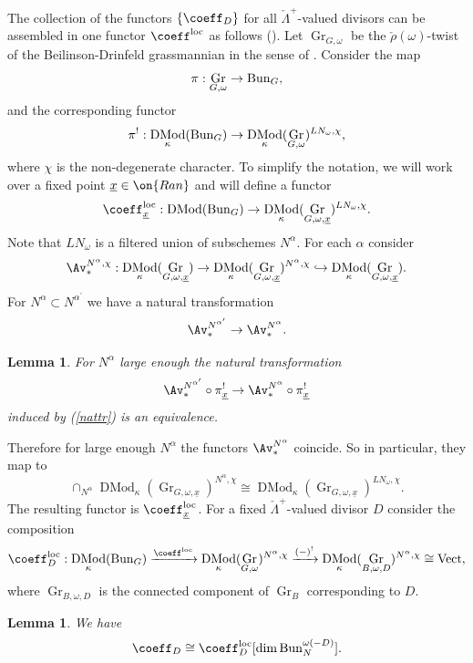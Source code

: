 \documentclass[9pt]{amsart}
\DeclareMathOperator{\Gra}{{Gr}}
\newcommand{\Ranp}{{\on{Ran}}}
\DeclareMathOperator{\Vect}{{Vect}}
\newtheorem{lm}[subsubsection]{Lemma}
\numberwithin{equation}{section}
\DeclareMathOperator{\D}{{DMod}}
\begin{document}
	\subsubsection{} The collection of the functors $\{\coeff_D \}$ for all $\check{\Lambda}^+$-valued divisors can be assembled in one functor $\coeff^{\operatorname{loc}}$ as follows (\cite[9.3]{GLCII}). Let $\Gra_{G, \omega}$ be the $\check{\rho}(\omega)$-twist of the Beilinson-Drinfeld grassmannian in the sense of \cite[1.2]{GLCII}. Consider the map 
	$$
	\pi: \Gra_{G, \omega} \rightarrow \Bun_G,
	$$
	and the corresponding functor
	$$\pi^!: \D_{\kappa}(\Bun_G) \rightarrow \D_{\kappa}(\Gra_{G, \omega})^{LN_{\omega}, \chi},$$
	where $\chi$ is the non-degenerate character. 
	To simplify the notation, we will work over a fixed point $\underline{x} \in \Ranp$ and will define a functor 
	$$\coeff^{\operatorname{loc}}_{\underline{x}}: \D(\Bun_G) \rightarrow \D_{\kappa}(\Gra_{G, \omega, \underline{x}})^{LN_{\omega}, \chi}.$$
	Note that $LN_{\omega}$ is a filtered union of subschemes $N^{\alpha}$. For each $\alpha$ consider
	$$\Av_*^{N^{\alpha}, \chi}: \D_{\kappa}(\Gra_{G, \omega, \underline{x}}) \rightarrow \D_{\kappa}(\Gra_{G, \omega, \underline{x}})^{N^{\alpha}, \chi} \hookrightarrow \D_{\kappa}(\Gra_{G, \omega, \underline{x}}) .$$
	For $N^{\alpha} \subset N^{\alpha^{\prime}}$ we have a natural transformation
	\begin{equation}\label{nattr}
	\Av_*^{N^{\alpha^{\prime}}} \rightarrow \Av_*^{N^{\alpha}}.
	\end{equation}
	\begin{lm}{\cite[Lemma 9.3.4]{GLCII}}
		For $N^{\alpha}$ large enough the natural transformation 
		$$\Av_*^{N^{\alpha^{\prime}}} \circ \pi_{\underline{x}}^! \rightarrow \Av_*^{N^{\alpha}} \circ \pi_{\underline{x}}^!$$
		induced by (\ref{nattr}) is an equivalence.
	\end{lm}
	Therefore for large enough $N^{\alpha}$ the functors $ \Av_*^{N^{\alpha}}$ coincide. So in particular, they map to $$\cap_{N^{\alpha}}\D_{\kappa}(\Gra_{G, \omega, \underline{x}})^{N^{\alpha}, \chi} \cong \D_{\kappa}(\Gra_{G, \omega, \underline{x}})^{LN_{\omega}, \chi}.$$
	The resulting functor is $\coeff^{\operatorname{loc}}_{\underline{x}}$. For a fixed $\check{\Lambda}^+$-valued divisor $D$ consider the composition 
	\begin{equation}
	\coeff^{\operatorname{loc}}_D: \D_{\kappa}(\Bun_G) \xrightarrow{\coeff^{\operatorname{loc}}} \D_{\kappa}(\Gra_{G, \omega})^{N^{\alpha}, \chi} \xrightarrow{(-)^!} \D_{\kappa}(\Gra_{B, \omega, D})^{N^{\alpha}, \chi} \cong \Vect,
	\end{equation}
	where $\Gra_{B, \omega, D}$ is the connected component of $\Gra_B$ corresponding to $D$. 
	\begin{lm}
		We have $$\coeff_D\cong \coeff^{\operatorname{loc}}_D[\dim \Bun_N^{\omega(-D)}].$$
	\end{lm}
	
\end{document}
